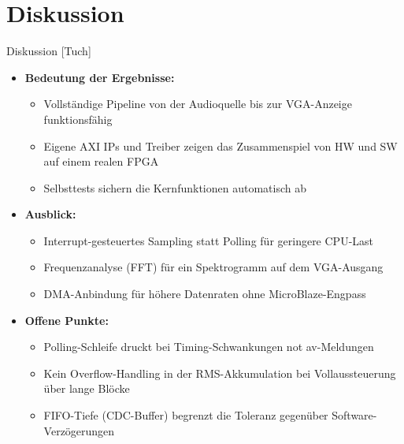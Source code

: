 \section{Diskussion}
\begin{frame}{Diskussion [Tuch]}
    \begin{itemize}
        \item \textbf{Bedeutung der Ergebnisse:}
        \begin{itemize}
            \item Vollständige Pipeline von der Audioquelle bis zur VGA-Anzeige funktionsfähig
            \item Eigene AXI IPs und Treiber zeigen das Zusammenspiel von HW und SW auf einem realen FPGA
            \item Selbsttests sichern die Kernfunktionen automatisch ab
        \end{itemize}
        \item \textbf{Ausblick:}
        \begin{itemize}
            \item Interrupt-gesteuertes Sampling statt Polling für geringere CPU-Last
            \item Frequenzanalyse (FFT) für ein Spektrogramm auf dem VGA-Ausgang
            \item DMA-Anbindung für höhere Datenraten ohne MicroBlaze-Engpass
        \end{itemize}
        \item \textbf{Offene Punkte:}
        \begin{itemize}
            \item Polling-Schleife druckt bei Timing-Schwankungen \glqq not av\grqq{}-Meldungen
            \item Kein Overflow-Handling in der RMS-Akkumulation bei Vollaussteuerung über lange Blöcke
            \item FIFO-Tiefe (CDC-Buffer) begrenzt die Toleranz gegenüber Software-Verzögerungen
        \end{itemize}
    \end{itemize}
\end{frame}
